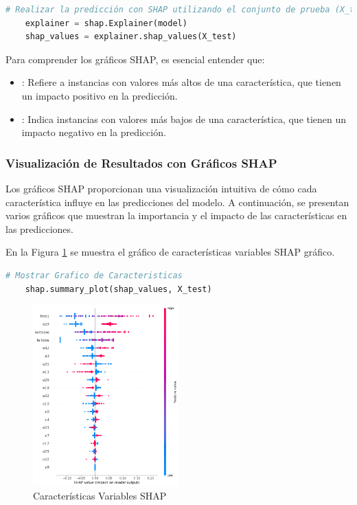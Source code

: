 \begin{lstlisting}[language=Python, caption=Predicción con SHAP utilizando el conjunto de prueba, label=lst:shap_analysis]
    # Realizar la predicción con SHAP utilizando el conjunto de prueba (X_test)
    explainer = shap.Explainer(model)
    shap_values = explainer.shap_values(X_test)
\end{lstlisting}


Para comprender los gráficos SHAP, es esencial entender que:

\begin{itemize}
    \item {}: Refiere a instancias con valores más altos de una característica, que tienen un impacto positivo en la predicción.
    \item {}: Indica instancias con valores más bajos de una característica, que tienen un impacto negativo en la predicción.
\end{itemize}

\subsubsection{Visualización de Resultados con Gráficos SHAP}

Los gráficos SHAP proporcionan una visualización intuitiva de cómo cada característica influye en las predicciones del modelo. A continuación, se presentan varios gráficos que muestran la importancia y el impacto de las características en las predicciones.




En la Figura \ref{fig:caract_var_shap} se muestra el gráfico de características variables SHAP gráfico.

\begin{lstlisting}[language=Python, caption=Grafico de Caracteristicas, label=lst:graf_caracteristicas]
    # Mostrar Grafico de Caracteristicas
    shap.summary_plot(shap_values, X_test)
\end{lstlisting}

\begin{figure}[H]
    \centering
    \includegraphics[width=0.5\textwidth]{img/shap_rf/shapForcePlot2.png}
    \caption{Características Variables SHAP}
    \label{fig:caract_var_shap}
\end{figure}

